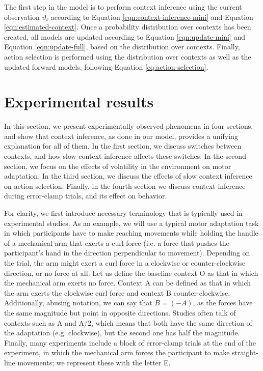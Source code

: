 \documentclass[a4paper,doc,floatsintext,natbib]{apa6}
\def \eref #1{Equation \ref{#1}}   %
\begin{document}
The first step in the model is to perform context inference using the current observation $\vartheta_t$ according to \eref{eqn:context-inference-mini} and \eref{eqn:estimated-context}. Once a probability distribution over contexts has been created, all models are updated according to \eref{eqn:update-mini} and \eref{eqn:update-full}, based on the distribution over contexts. Finally, action selection is performed using the distribution over contexts as well as the updated forward models, following \eref{eq:action-selection}.


\section{Experimental results}
In this section, we present experimentally-observed phenomena in four sections, and show that context inference, as done in our model, provides a unifying explanation for all of them. In the first section, we discuss switches between contexts, and how slow context inference affects these switches. In the second section, we focus on the effects of volatility in the environment on motor adaptation. In the third section, we discuss the effects of slow context inference on action selection. Finally, in the fourth section we discuss context inference during error-clamp trials, and its effect on behavior.

For clarity, we first introduce necessary terminology that is typically used in experimental studies. As an example, we will use a typical motor adaptation task in which participants have to make reaching movements while holding the handle of a mechanical arm that exerts a curl force (i.e. a force that pushes the participant's hand in the direction perpendicular to movement). Depending on the trial, the arm might exert a curl force in a clockwise or counter-clockwise direction, or no force at all. Let us define the baseline context O as that in which the mechanical arm exerts no force. Context A can be defined as that in which the arm exerts the clockwise curl force and context B counter-clockwise. Additionally, abusing notation, we can say that $B = (-A)$, as the forces have the same magnitude but point in opposite directions. Studies often talk of contexts such as A and A/2, which means that both have the same direction of the adaptation (e.g. clockwise), but the second one has half the magnitude. Finally, many experiments include a block of error-clamp trials at the end of the experiment, in which the mechanical arm forces the participant to make straight-line movements; we represent these with the letter E.
\end{document}
